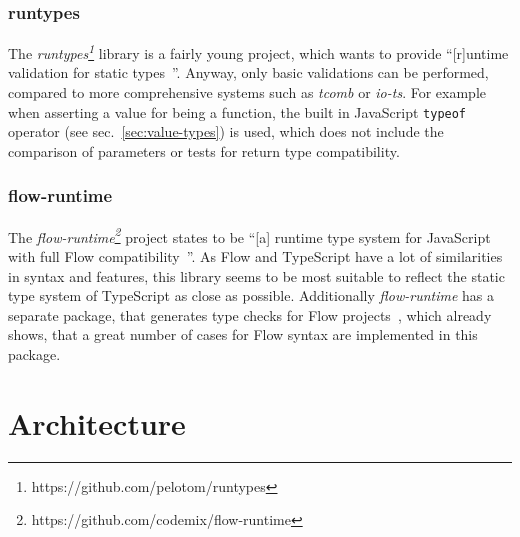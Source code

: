 \subsubsection{runtypes}

The \emph{runtypes\footnote{https://github.com/pelotom/runtypes}} library is a fairly young project, which wants to provide ``[r]untime validation for static types~\cite{RuntimeTypeSystem:runtypes}''. Anyway, only basic validations can be performed, compared to more comprehensive systems such as \emph{tcomb} or \emph{io-ts}. For example when asserting a value for being a function, the built in JavaScript \texttt{typeof} operator (see sec.~\ref{sec:value-types}) is used, which does not include the comparison of parameters or tests for return type compatibility.

\subsubsection{flow-runtime}

The \emph{flow-runtime\footnote{https://github.com/codemix/flow-runtime}} project states to be ``[a] runtime type system for JavaScript with full Flow compatibility~\cite{RuntimeTypeSystem:flow-runtime:lib}''. As Flow and TypeScript have a lot of similarities in syntax and features, this library seems to be most suitable to reflect the static type system of TypeScript as close as possible. Additionally \emph{flow-runtime} has a separate package, that generates type checks for Flow projects~\cite{RuntimeTypeSystem:flow-runtime:babel}, which already shows, that a great number of cases for Flow syntax are implemented in this package.





\section{Architecture}
\label{sec:architecture}

